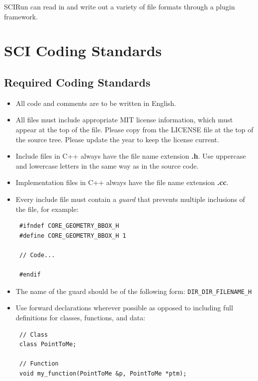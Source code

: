 \documentclass[fleqn,12pt,openany]{book}
\begin{document}
SCIRun can read in and write out a variety of file formats through a plugin framework.

\chapter{SCI Coding Standards}

\section{Required Coding Standards}

\begin{itemize}
\item
All code and comments are to be written in English.

\item
All files must include appropriate MIT license information, which must appear at
the top of the file.
Please copy from the LICENSE file at the top of the source tree.
Please update the year to keep the license current.

\item
Include files in C++ always have the file name extension \textbf{.h}.
Use uppercase and lowercase letters in the same way as in the source code.

\item
Implementation files in C++ always have the file name extension \textbf{.cc}.

\item
Every include file must contain a \emph{guard} that prevents multiple
inclusions of the file, for example:

\begin{verbatim}
 #ifndef CORE_GEOMETRY_BBOX_H 
 #define CORE_GEOMETRY_BBOX_H 1
 
 // Code...
 
 #endif
\end{verbatim}

\item
The name of the guard should be of the following form:
\texttt{DIR\_DIR\_FILENAME\_H}

\item
Use forward declarations wherever possible as opposed to including full
definitions for classes, functions, and data:

\begin{verbatim}
 // Class
 class PointToMe;
 
 // Function
 void my_function(PointToMe &p, PointToMe *ptm);
 

\end{verbatim}
\end{itemize}
\end{document}
